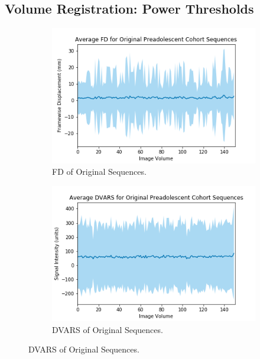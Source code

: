 \subsection{Volume Registration: Power Thresholds}

\begin{figure}[t]
	\centering
	\begin{subfigure}{0.4\textwidth}
		\centering
		\includegraphics[width=1.0\textwidth]{6/figures/preads-bold-fd-150.png}
		\caption{FD of Original Sequences.}
	\end{subfigure}
	\hspace{0.05\textwidth}
	\begin{subfigure}{0.4\textwidth}
		\centering
		\includegraphics[width=1.0\textwidth]{6/figures/preads-bold-dvars-150.png}
		\caption{DVARS of Original Sequences.}
	\end{subfigure}
	

\end{figure}
